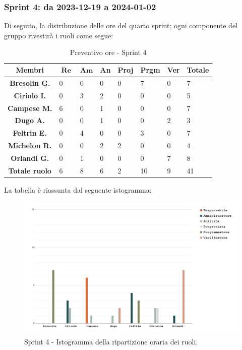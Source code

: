 \documentclass[10pt, a4paper]{article}
\begin{document}
\subsubsection{Sprint 4: da 2023-12-19 a 2024-01-02}
Di seguito, la distribuzione delle ore del quarto sprint; ogni componente del gruppo rivestirà i ruoli come segue:
\begin{table}[H]
    \begin{tabularx}{\textwidth}{c|X|X|X|X|X|X|X}
        \textbf{Membri} & $\operatorname{\textbf{Re}}$ & $\mathrm{\textbf{Am}}$ & \textbf{An} & \textbf{Proj} & \textbf{Prgm} & \textbf{Ver} & \textbf{Totale} \\
        \hline
        \textbf{Bresolin G.} & 0 & 0 & 0 & 0 & \cellcolor{primarycolor}7 & 0 & 7 \\
        \hline
        \textbf{Ciriolo I.}  & 0 & 3 & \cellcolor{primarycolor}2 & 0 & 0 & 0 & 5 \\
        \hline
        \textbf{Campese M.}  & \cellcolor{primarycolor}6 & 0 & 1 & 0 & 0 & 0 & 7 \\
        \hline
        \textbf{Dugo A.}     & 0 & 0 &\cellcolor{primarycolor}1 & 0 & 0 & 2 & 3 \\
        \hline
        \textbf{Feltrin E.}  & 0 & \cellcolor{primarycolor}4 & 0 & 0 & 3 & 0 & 7 \\
        \hline
        \textbf{Michelon R.} & 0 & 0 & \cellcolor{primarycolor}2 & 2 & 0 & 0 & 4 \\
        \hline
        \textbf{Orlandi G.}  & 0 & 1 & 0 & 0 & 0 & \cellcolor{primarycolor}7 & 8 \\
        \hline
        \textbf{Totale ruolo} & 6 & 8 & 6 & 2 & 10 & 9 & 41 \\
    \end{tabularx}
    \caption{Preventivo ore - Sprint 4}
\end{table}

La tabella è riassunta dal seguente istogramma:
 \begin{figure}[H]
        \centering        
        \includegraphics[width=15.5cm]{istogrammi/istogramma_4_periodo.png}
        \caption{Sprint 4 - Istogramma della ripartizione oraria dei ruoli. }
    \end{figure}
\end{document}

